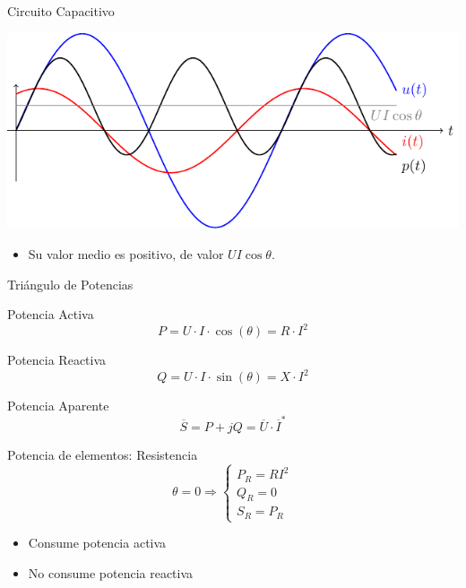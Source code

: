 \documentclass[xcolor={usenames,svgnames,dvipsnames}]{beamer}
\begin{document}
\begin{frame}[label={sec:orgc2d247f}]{Circuito Capacitivo}
\begin{center}
\includegraphics[width=.9\linewidth]{../figs/capacitivoPotencia.pdf}
\end{center}

\begin{itemize}
\item Su valor medio es positivo, de valor \(U I \cos \theta\).
\end{itemize}
\end{frame}

\begin{frame}[label={sec:orgb1a2c18}]{Triángulo de Potencias}
\begin{block}{Potencia Activa}
\[  
P = U\cdot I\cdot\cos(\theta) = R \cdot I^2
\]
\end{block}

\begin{block}{Potencia Reactiva}
\[
Q = U\cdot I\cdot\sin(\theta) = X \cdot I^2
\]
\end{block}

\begin{block}{Potencia Aparente}
\[
\overline{S} = P + jQ = \overline{U} \cdot \overline{I}^*
\]
\end{block}
\end{frame}

\begin{frame}[label={sec:org2efea8a}]{Potencia de elementos: Resistencia}
\[
\theta = 0 \Rightarrow 
\begin{cases}
  P_R = R I^2\\
  Q_R = 0\\
  S_R = P_R
\end{cases}
\]

\begin{itemize}
\item Consume potencia activa
\item No consume potencia reactiva
\end{itemize}
\end{frame}
\end{document}
